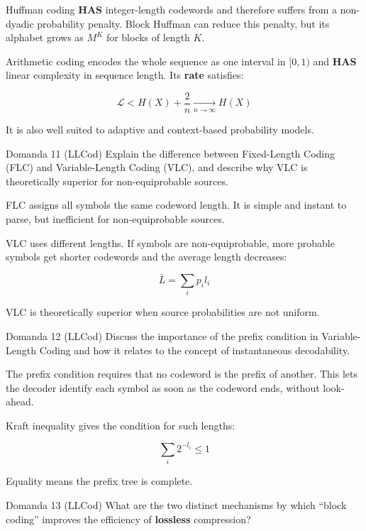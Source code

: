 Huffman coding \textbf{HAS} integer-length codewords and therefore suffers from a non-dyadic probability penalty. Block Huffman can reduce this penalty, but its alphabet grows as $M^K$ for blocks of length $K$.

Arithmetic coding encodes the whole sequence as one interval in $[0,1)$ and \textbf{HAS} linear complexity in sequence length. Its \textbf{rate} satisfies:


$$
\mathcal{L} < H(X) + \frac{2}{n}
\xrightarrow[n\to\infty]{}
H(X)
$$


It is also well suited to adaptive and context-based probability models.



\begin{questionbox}{Domanda 11}
(LLCod) Explain the difference between Fixed-Length Coding (FLC) and Variable-Length Coding (VLC), and describe why VLC is theoretically superior for non-equiprobable sources.
\end{questionbox}


FLC assigns all symbols the same codeword length. It is simple and instant to parse, but inefficient for non-equiprobable sources.

VLC uses different lengths. If symbols are non-equiprobable, more probable symbols get shorter codewords and the average length decreases:


$$
\bar{L} = \sum_i p_i l_i
$$


VLC is theoretically superior when source probabilities are not uniform.



\begin{questionbox}{Domanda 12}
(LLCod) Discuss the importance of the prefix condition in Variable-Length Coding and how it relates to the concept of instantaneous decodability.
\end{questionbox}


The prefix condition requires that no codeword is the prefix of another. This lets the decoder identify each symbol as soon as the codeword ends, without look-ahead.

Kraft inequality gives the condition for such lengths:


$$
\sum_i 2^{-l_i}\le 1
$$


Equality means the prefix tree is complete.



\begin{questionbox}{Domanda 13}
(LLCod) What are the two distinct mechanisms by which “block coding” improves the efficiency of \textbf{lossless} compression?
\end{questionbox}


